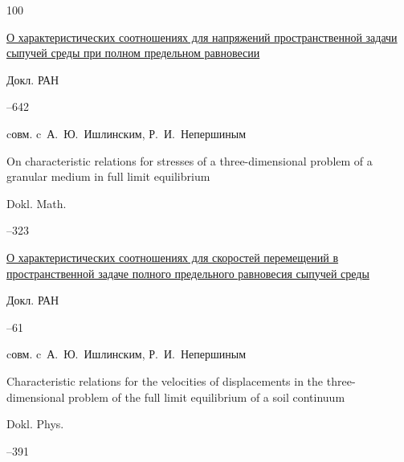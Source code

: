\begin{thebibliography}{100}

\paper \href{http://mi.mathnet.ru/dan2160}{О характеристических соотношениях для напряжений пространственной задачи сыпучей среды при полном предельном равновесии}

\jour Докл. РАН




--642

\miscnote cовм. c~А.~Ю.~Ишлинским, Р.~И.~Непершиным



\transl

\paper  On characteristic relations for stresses of a three-dimensional problem of a granular medium in full limit equilibrium

\jour Dokl. Math.




--323






\paper \href{http://mi.mathnet.ru/dan16197}{О характеристических соотношениях для скоростей перемещений в пространственной задаче полного предельного равновесия сыпучей среды}

\jour Докл. РАН




--61


\miscnote cовм. c~А.~Ю.~Ишлинским, Р.~И.~Непершиным

\transl


\paper Characteristic relations for the velocities of displacements in the three-dimensional problem of the full limit equilibrium of a soil continuum

\jour Dokl. Phys.



--391


\end{thebibliography}
